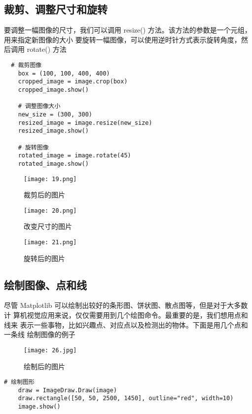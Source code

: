 \documentclass[a4paper, 12pt]{article}
\begin{document}
\subsection{裁剪、调整尺寸和旋转}
要调整一幅图像的尺寸，我们可以调用 resize() 方法。该方法的参数是一个元组，
用来指定新图像的大小
要旋转一幅图像，可以使用逆时针方式表示旋转角度，然后调用 rotate() 方法

\begin{verbatim}
  # 裁剪图像
    box = (100, 100, 400, 400)
    cropped_image = image.crop(box)
    cropped_image.show()

    # 调整图像大小
    new_size = (300, 300)
    resized_image = image.resize(new_size)
    resized_image.show()

    # 旋转图像
    rotated_image = image.rotate(45)
    rotated_image.show()
  \end{verbatim}

\begin{figure}[H]
  \centering
    \texttt{[image: 19.png]}
  \caption{裁剪后的图片}
   \end{figure}  
   
   \begin{figure}[H]
  \centering
    \texttt{[image: 20.png]}
  \caption{改变尺寸的图片}
   \end{figure}  
   
   \begin{figure}[H]
  \centering
    \texttt{[image: 21.png]}
  \caption{旋转后的图片}
   \end{figure}  
   

\subsection{绘制图像、点和线}
尽管 Matplotlib 可以绘制出较好的条形图、饼状图、散点图等，但是对于大多数计
算机视觉应用来说，仅仅需要用到几个绘图命令。最重要的是，我们想用点和线来
表示一些事物，比如兴趣点、对应点以及检测出的物体。下面是用几个点和一条线
绘制图像的例子

 \begin{figure}[H]
  \centering
    \texttt{[image: 26.jpg]}
  \caption{绘制后的图片}
   \end{figure}
 
\begin{verbatim}
# 绘制图形
    draw = ImageDraw.Draw(image)
    draw.rectangle([50, 50, 2500, 1450], outline="red", width=10)
    image.show()
\end{verbatim}
\end{document}
